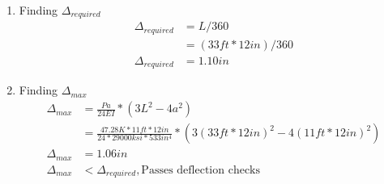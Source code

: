 \documentclass{report} %
\begin{document}
\begin{enumerate}
\begin{enumerate}
        \item Finding $\Delta _{required}$
            \begin{equation*}
                \begin{aligned}
                    \Delta _{required} &= L/360 \\
                                &= (33ft * 12in)/360\\
                    \Delta _{required} &= 1.10in    
                \end{aligned}
            \end{equation*} 
        \item Finding $\Delta _{max}$
            \begin{equation*}
                \begin{aligned}
                    \Delta _{max} &= \frac{Pa}{24EI} * (3L^2-4a^2)\\ %
                            &= \frac{47.28K * 11ft * 12in}{24 * 29000ksi * 533in^4} * (3(33ft * 12in)^2-4(11ft * 12in)^2) \\
                    \Delta _{max} &= 1.06in \\
                    \Delta _{max} &< \Delta _{required}, \text{Passes deflection checks}    
                \end{aligned}
            \end{equation*}
        \end{enumerate}
\end{enumerate}

\newpage
\end{document}
